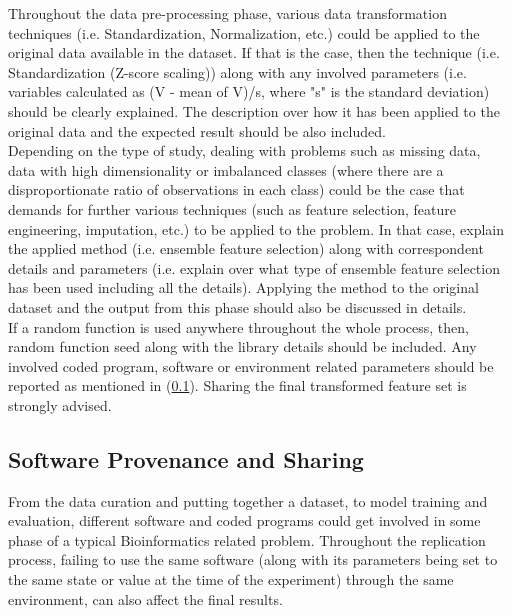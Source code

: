     Throughout the data pre-processing phase, various data transformation techniques (i.e. Standardization, Normalization, etc.)
    could be applied to the original data available in the dataset. If that is the case, then the technique 
    (i.e. Standardization (Z-score scaling)) along with any involved parameters 
    (i.e. variables calculated as (V - mean of V)/s, where "s" is the standard deviation)
    should be clearly explained. The description over how it has been applied to the original data  and the expected result 
    should be also included.\\
    
    Depending on the type of study, dealing with problems such as missing data, data with high dimensionality or imbalanced classes 
    (where there are a disproportionate ratio of observations in each class) could be the case that demands for further various techniques 
    (such as feature selection, feature engineering, imputation, etc.) to be applied to the problem. In that case, explain the applied method 
    (i.e. ensemble feature selection) along with correspondent details and parameters (i.e. explain over what type of ensemble feature selection 
    has been used including all the details). Applying the method to the original dataset and the output from this phase should also be 
    discussed in details.\\
    
    
    
    
    
    
    If a random function is used anywhere throughout the whole process, then, random function seed along 
    with the library details should be included. Any involved coded program, software or environment related parameters 
    should be reported as mentioned in (\ref{sec:softwareProvenance}). Sharing the final transformed feature set is strongly advised.
    
\subsection{Software Provenance and Sharing}
    \label{sec:softwareProvenance}

    From the data curation \footnotemark[\value{footnote}]
    and putting together a dataset, to model training and evaluation, different software and coded programs 
    could get involved in some phase of a typical Bioinformatics related problem. 
    Throughout the replication process, failing to use the same software (along with its parameters 
    being set to the same state or value at the time of the experiment) through the same environment, can also affect the final results. \\
    
